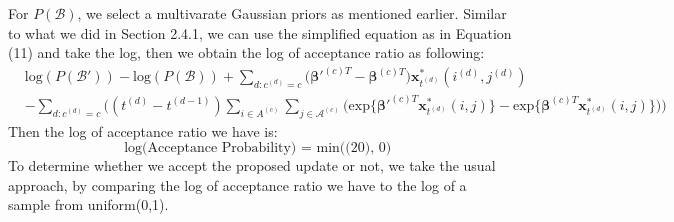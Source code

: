 \documentclass[a4paper]{article}
\begin{document}
For $P(\mathcal{B})$, we select a multivarate Gaussian priors as mentioned earlier. Similar to what we did in Section 2.4.1, we can use the simplified equation as in Equation (11) and take the log, then we obtain the log of acceptance ratio as following:
\begin{equation}
\begin{aligned} 
&\mbox{log}(P(\mathcal{B'}))-\mbox{log}(P(\mathcal{B}))+\sum_{d:c^{(d)}=c}\Big(\boldsymbol{\beta'}^{(c)T}-\boldsymbol{\beta}^{(c)T}\Big)\boldsymbol{x}^*_{t^{(d)}}(i^{(d)}, j^{(d)})\\&-\sum_{d:c^{(d)}=c}\Big((t^{(d)}-t^{(d-1)})\sum\limits_{i \in A^{(c)}}\sum\limits_{j\in \mathcal{A}^{(c)}}\Big(\mbox{exp}\Big\{\boldsymbol{\beta'}^{(c)T}\boldsymbol{x}^*_{t^{(d)}}(i, j)\Big\}-\mbox{exp}\Big\{\boldsymbol{\beta}^{(c)T}\boldsymbol{x}^*_{t^{(d)}}(i, j)\Big\}\Big)\Big)
\end{aligned}
\end{equation}
Then the log of acceptance ratio we have is:
\begin{equation}
\mbox{log(Acceptance Probability) = min((20), 0) }
\end{equation}
To determine whether we accept the proposed update or not, we take the usual approach, by comparing the log of acceptance ratio we have to the log of a sample from uniform(0,1).
\end{document}
